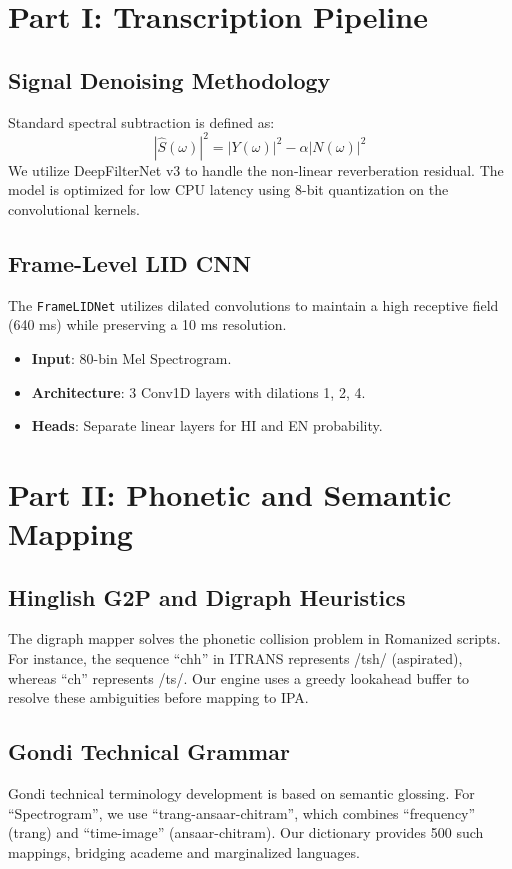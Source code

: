 \documentclass[10pt,twocolumn,letterpaper]{article}
\begin{document}
\section{Part I: Transcription Pipeline}

\subsection{Signal Denoising Methodology}
Standard spectral subtraction is defined as:
\begin{equation}
|\hat{S}(\omega)|^2 = |Y(\omega)|^2 - \alpha |N(\omega)|^2
\end{equation}
We utilize DeepFilterNet v3 to handle the non-linear reverberation
residual. The model is optimized for low CPU latency using 8-bit
quantization on the convolutional kernels.

\subsection{Frame-Level LID CNN}
The \texttt{FrameLIDNet} utilizes dilated convolutions to maintain a high
receptive field (640 ms) while preserving a 10 ms resolution.
\begin{itemize}
    \item \textbf{Input}: 80-bin Mel Spectrogram.
    \item \textbf{Architecture}: 3 Conv1D layers with dilations 1, 2, 4.
    \item \textbf{Heads}: Separate linear layers for HI and EN probability.
\end{itemize}

\section{Part II: Phonetic and Semantic Mapping}

\subsection{Hinglish G2P and Digraph Heuristics}
The digraph mapper solves the phonetic collision problem in Romanized
scripts. For instance, the sequence ``chh'' in ITRANS represents
/tsh/ (aspirated), whereas ``ch'' represents /ts/. Our engine uses a greedy
lookahead buffer to resolve these ambiguities before mapping to IPA.

\subsection{Gondi Technical Grammar}
Gondi technical terminology development is based on semantic glossing.
For ``Spectrogram'', we use ``trang-ansaar-chitram'', which combines
``frequency'' (trang) and ``time-image'' (ansaar-chitram). Our dictionary
provides 500 such mappings, bridging academe and marginalized languages.
\end{document}
